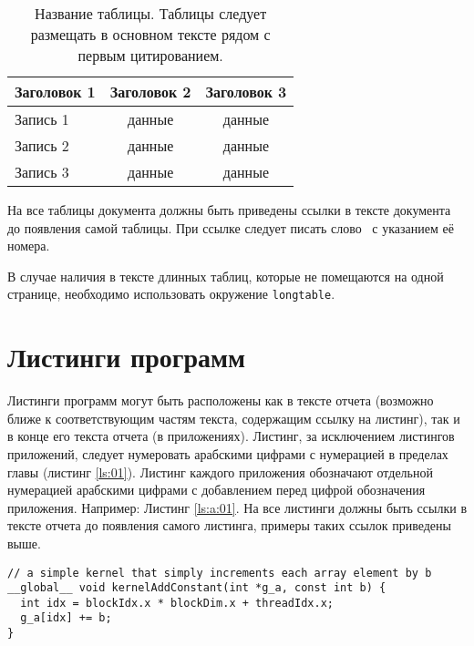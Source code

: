 \begin{table}[h]
\caption{Название таблицы. Таблицы следует размещать в основном тексте рядом с первым цитированием.}
\label{tab:1}
\begin{center}
\begin{tabular}{|l|c|c|}
\hline
Заголовок 1 & Заголовок 2 & Заголовок 3 \\
\hline
Запись 1 &данные &данные\\
\hline
Запись 2 &данные &данные\\
\hline
Запись 3 &данные &данные\\
\hline
\end{tabular}
\end{center}
\end{table}

На все таблицы документа должны быть приведены ссылки в тексте
документа до появления самой таблицы. При ссылке следует писать слово \guillemotright\ с указанием её номера.

В случае наличия в тексте длинных таблиц, которые не помещаются на одной странице, необходимо использовать окружение \verb|longtable|.

\section{Листинги программ}

Листинги программ могут быть расположены как в тексте отчета (возможно ближе к 
соответствующим частям текста, содержащим ссылку на листинг),  так и в конце его текста отчета (в приложениях). Листинг, за исключением листингов приложений, следует нумеровать арабскими цифрами с нумерацией в пределах главы (листинг \ref{ls:01}).
Листинг каждого приложения обозначают отдельной нумерацией арабскими цифрами с добавлением перед цифрой обозначения приложения. Например: Листинг \ref{ls:a:01}.
На все листинги должны быть ссылки в тексте отчета до появления самого листинга, примеры таких ссылок приведены выше.

\begin{lstlisting}[caption={Пример листинга в тексте}, label={ls:01}]
// a simple kernel that simply increments each array element by b
__global__ void kernelAddConstant(int *g_a, const int b) {
  int idx = blockIdx.x * blockDim.x + threadIdx.x;
  g_a[idx] += b;
}
\end{lstlisting}

